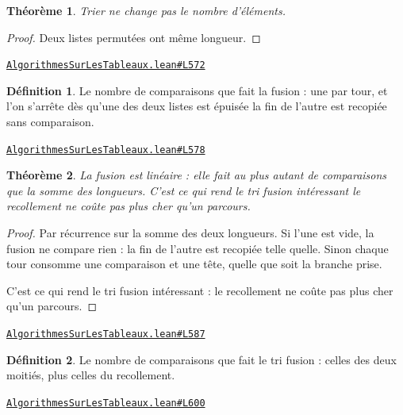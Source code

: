 \documentclass[11pt,a4paper]{article}
\theoremstyle{definition}
\newtheorem{definition}{Définition}
\theoremstyle{plain}
\newtheorem{theoreme}{Théorème}
\newcommand{\source}[2]{\par\smallskip\noindent\hfill{\footnotesize\href{#1}{\texttt{#2}}}\par\smallskip}
\begin{document}
\begin{theoreme}
Trier ne change pas le nombre d'éléments.
\end{theoreme}
\begin{proof}
Deux listes permutées ont même longueur.
\end{proof}
\source{https://github.com/Commutator-IO/learn-lean/blob/main/courses/02-lycee/11-informatique-nsi/AlgorithmesSurLesTableaux.lean\#L572}{AlgorithmesSurLesTableaux.lean\#L572}

\begin{definition}
Le nombre de comparaisons que fait la fusion : une par tour, et l'on s'arrête dès
qu'une des deux listes est épuisée \textemdash{} la fin de l'autre est recopiée sans comparaison.
\end{definition}
\source{https://github.com/Commutator-IO/learn-lean/blob/main/courses/02-lycee/11-informatique-nsi/AlgorithmesSurLesTableaux.lean\#L578}{AlgorithmesSurLesTableaux.lean\#L578}

\begin{theoreme}
La fusion est linéaire : elle fait au plus autant de comparaisons que la somme des
longueurs. C'est ce qui rend le tri fusion intéressant \textemdash{} le recollement ne coûte pas
plus cher qu'un parcours.
\end{theoreme}
\begin{proof}
Par récurrence sur la somme des deux longueurs. Si l'une est vide, la fusion ne compare
rien : la fin de l'autre est recopiée telle quelle. Sinon chaque tour consomme une
comparaison et une tête, quelle que soit la branche prise.

C'est ce qui rend le tri fusion intéressant : le recollement ne coûte pas plus cher
qu'un parcours.
\end{proof}
\source{https://github.com/Commutator-IO/learn-lean/blob/main/courses/02-lycee/11-informatique-nsi/AlgorithmesSurLesTableaux.lean\#L587}{AlgorithmesSurLesTableaux.lean\#L587}

\begin{definition}
Le nombre de comparaisons que fait le tri fusion : celles des deux moitiés, plus
celles du recollement.
\end{definition}
\source{https://github.com/Commutator-IO/learn-lean/blob/main/courses/02-lycee/11-informatique-nsi/AlgorithmesSurLesTableaux.lean\#L600}{AlgorithmesSurLesTableaux.lean\#L600}
\end{document}
